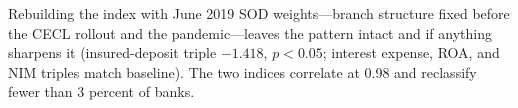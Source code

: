 Rebuilding the index with June 2019 SOD weights---branch structure fixed
before the CECL rollout and the pandemic---leaves the pattern intact and
if anything sharpens it (insured-deposit triple $-1.418$, $p<0.05$;
interest expense, ROA, and NIM triples match baseline).  The two indices
correlate at 0.98 and reclassify fewer than 3 percent of banks.
